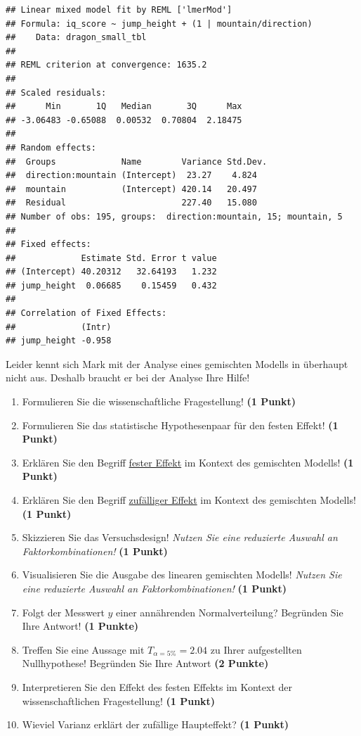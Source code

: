 \documentclass[a4paper, 9pt]{scrartcl}\usepackage[]{graphicx}\usepackage[]{xcolor}
\makeatletter
\newenvironment{kframe}{%
 \def\at@end@of@kframe{}%
 \ifinner\ifhmode%
  \def\at@end@of@kframe{\end{minipage}}%
  \begin{minipage}{\columnwidth}%
 \fi\fi%
 \def\FrameCommand##1{\hskip\@totalleftmargin \hskip-\fboxsep
 \colorbox{shadecolor}{##1}\hskip-\fboxsep
     \hskip-\linewidth \hskip-\@totalleftmargin \hskip\columnwidth}%
 \MakeFramed {\advance\hsize-\width
   \@totalleftmargin\z@ \linewidth\hsize
   \@setminipage}}%
 {\par\unskip\endMakeFramed%
 \at@end@of@kframe}
\newenvironment{knitrout}{}{} %
\makeatother
\begin{document}
\begin{knitrout}
\color{fgcolor}\begin{kframe}
\begin{verbatim}
## Linear mixed model fit by REML ['lmerMod']
## Formula: iq_score ~ jump_height + (1 | mountain/direction)
##    Data: dragon_small_tbl
## 
## REML criterion at convergence: 1635.2
## 
## Scaled residuals: 
##      Min       1Q   Median       3Q      Max 
## -3.06483 -0.65088  0.00532  0.70804  2.18475 
## 
## Random effects:
##  Groups             Name        Variance Std.Dev.
##  direction:mountain (Intercept)  23.27    4.824  
##  mountain           (Intercept) 420.14   20.497  
##  Residual                       227.40   15.080  
## Number of obs: 195, groups:  direction:mountain, 15; mountain, 5
## 
## Fixed effects:
##             Estimate Std. Error t value
## (Intercept) 40.20312   32.64193   1.232
## jump_height  0.06685    0.15459   0.432
## 
## Correlation of Fixed Effects:
##             (Intr)
## jump_height -0.958
\end{verbatim}
\end{kframe}
\end{knitrout}

Leider kennt sich Mark mit der Analyse eines gemischten Modells in \Rlogo überhaupt nicht aus. Deshalb braucht er bei der Analyse Ihre Hilfe!

\begin{enumerate}
  \item Formulieren Sie die wissenschaftliche Fragestellung! \textbf{(1 Punkt)}
  \item Formulieren Sie das statistische Hypothesenpaar für den festen Effekt! \textbf{(1 Punkt)}
  \item Erklären Sie den Begriff \underline{fester Effekt} im Kontext des gemischten Modells! \textbf{(1 Punkt)}
  \item Erklären Sie den Begriff \underline{zufälliger Effekt} im Kontext des gemischten Modells! \textbf{(1 Punkt)}
  \item Skizzieren Sie das Versuchsdesign! \textit{Nutzen Sie eine reduzierte Auswahl an Faktorkombinationen!} \textbf{(1 Punkt)} 
  \item Visualisieren Sie die Ausgabe des linearen gemischten Modells! \textit{Nutzen Sie eine reduzierte Auswahl an Faktorkombinationen!} \textbf{(1 Punkt)} 
  \item Folgt der Messwert $y$ einer annährenden Normalverteilung? Begründen Sie Ihre Antwort! \textbf{(1 Punkte)}
\item Treffen Sie eine Aussage mit $T_{\alpha = 5\%} = 2.04$ zu Ihrer aufgestellten Nullhypothese! Begründen Sie Ihre Antwort \textbf{(2 Punkte)}
\item Interpretieren Sie den Effekt des festen Effekts im Kontext der wissenschaftlichen Fragestellung! \textbf{(1 Punkt)}
\item Wieviel Varianz erklärt der zufällige Haupteffekt? \textbf{(1 Punkt)}
\end{enumerate} 
\clearpage
\end{document}
